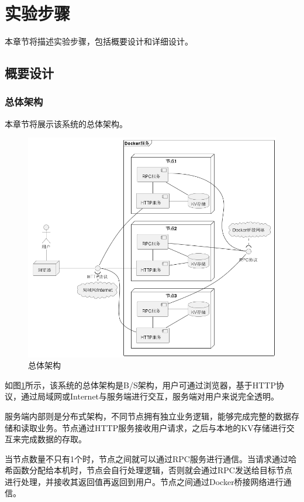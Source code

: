 \section{实验步骤}

本章节将描述实验步骤，包括概要设计和详细设计。

\subsection{概要设计}

\subsubsection{总体架构}

本章节将展示该系统的总体架构。

\begin{figure}[H]
    \centering
    \includegraphics[width=\linewidth]{examples/总体架构.png}
    \caption{总体架构}
    \label{fig:arch}
\end{figure}

如图\ref{fig:arch}所示，该系统的总体架构是B/S架构，用户可通过浏览器，基于HTTP协议，通过局域网或Internet与服务端进行交互，服务端对用户来说完全透明。

服务端内部则是分布式架构，不同节点拥有独立业务逻辑，能够完成完整的数据存储和读取业务。节点通过HTTP服务接收用户请求，之后与本地的KV存储进行交互来完成数据的存取。

当节点数量不只有1个时，节点之间就可以通过RPC服务进行通信。当请求通过哈希函数分配给本机时，节点会自行处理逻辑，否则就会通过RPC发送给目标节点进行处理，并接收其返回值再返回到用户。节点之间通过Docker桥接网络进行通信。

